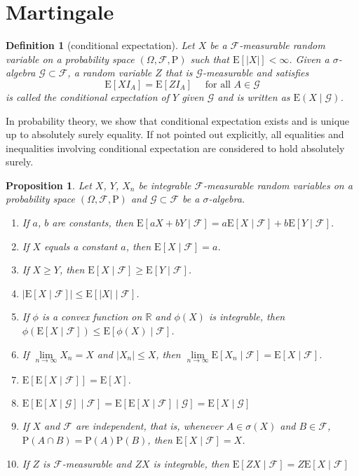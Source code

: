 \documentclass{article}
\newtheorem{definition}{Definition}[section]
\newtheorem{proposition}{Proposition}[section]
\theoremstyle{nonumberplain}
\begin{document}
\section{Martingale}
\begin{definition}[conditional expectation]
	Let $X$ be a $\mathcal{F}$-measurable random variable on a probability space $(\Omega,\mathcal{F},\mathrm{P})$ such that $\mathrm{E}[|X|] < \infty$. Given a $\sigma$-algebra $\mathcal{G}\subset\mathcal{F}$, a random variable $Z$ that is $\mathcal{G}$-measurable and satisfies 
	\[
	\mathrm{E}[X I_A] = \mathrm{E}[ZI_A] \quad\text{ for all }A \in \mathcal{G}
	\] 
	is called the \emph{conditional expectation} of $Y$ given $\mathcal{G}$ and is written as $\mathrm{E}(X\mid\mathcal{G})$.
\end{definition}
In probability theory, we show that conditional expectation exists and is unique up to absolutely surely equality. If not pointed out explicitly, all equalities and inequalities involving conditional expectation are considered to hold absolutely surely. 
\begin{proposition}
	Let $X$, $Y$, $X_n$ be integrable $\mathcal{F}$-measurable random variables on a probability space $(\Omega,\mathcal{F},\mathrm{P})$ and  $\mathcal{G}\subset\mathcal{F}$ be a $\sigma$-algebra.
	\begin{enumerate}  
		\item If $a$, $b$ are constants, then $\mathrm{E}[aX+bY\mid\mathcal{F}]=a\mathrm{E}[X\mid\mathcal{F}]+b\mathrm{E}[Y\mid\mathcal{F}]$.
		\item If $X$ equals a constant $a$, then $\mathrm{E}[X\mid\mathcal{F}]=a$.
		\item If $X\ge Y$,  then $\mathrm{E}[X\mid\mathcal{F}]\ge\mathrm{E}[Y\mid\mathcal{F}]$.
		\item $|\mathrm{E}[X\mid\mathcal{F}]|\le\mathrm{E}[|X|\mid\mathcal{F}]$.
		\item If $\phi$ is a convex function on $\mathbb{R}$ and $\phi(X)$ is integrable, then $\phi(\mathrm{E}[X\mid\mathcal{F}])\le\mathrm{E}[\phi(X)\mid\mathcal{F}]$.
		\item If $\lim\limits_{n\to\infty}X_n=X$ and $|X_n|\le X$, then $\lim\limits_{n\to\infty}\mathrm{E}[X_n\mid\mathcal{F}]=\mathrm{E}[X\mid\mathcal{F}]$.
		\item $\mathrm{E}[\mathrm{E}[X\mid\mathcal{F}]]=\mathrm{E}[X]$.
		\item $\mathrm{E}[\mathrm{E}[X\mid\mathcal{G}]\mid\mathcal{F}]=\mathrm{E}[\mathrm{E}[X\mid\mathcal{F}]\mid\mathcal{G}]=\mathrm{E}[X\mid\mathcal{G}]$
		\item If $X$ and $\mathcal{F}$ are independent, that is, whenever $A\in\sigma(X)$ and $B\in\mathcal{F}$, $\mathrm{P}(A\cap B)= \mathrm{P}(A) \mathrm{P}(B)$, then $\mathrm{E}[X\mid\mathcal{F}]=X$.
		\item If $Z$ is $\mathcal{F}$-measurable and $ZX$ is integrable, then $\mathrm{E}[ZX\mid\mathcal{F}]=Z\mathrm{E}[X\mid\mathcal{F}]$
	\end{enumerate}
\end{proposition}
\end{document}

